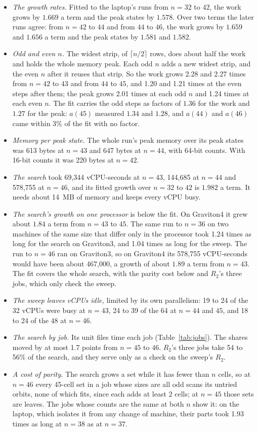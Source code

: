 \documentclass[11pt]{a000104}
\numberwithin{equation}{section}
\begin{document}
\begin{itemize}
  \item \emph{The growth rates.} Fitted to the laptop's runs from $n = 32$ to $42$, the work grows by $1.669$ a term and the peak states by $1.578$. Over two terms the later runs agree: from $n = 42$ to $44$ and from $44$ to $46$, the work grows by $1.659$ and $1.656$ a term and the peak states by $1.581$ and $1.582$.
  \item \emph{Odd and even $n$.} The widest strip, of $\lceil n/2 \rceil$ rows, does about half the work and holds the whole memory peak. Each odd $n$ adds a new widest strip, and the even $n$ after it reuses that strip. So the work grows 2.28 and 2.27 times from $n = 42$ to $43$ and from $44$ to $45$, and 1.20 and 1.21 times at the even steps after them; the peak grows 2.01 times at each odd $n$ and 1.24 times at each even $n$. The fit carries the odd steps as factors of $1.36$ for the work and $1.27$ for the peak: $a(45)$ measured $1.34$ and $1.28$, and $a(44)$ and $a(46)$ came within 3\% of the fit with no factor.
  \item \emph{Memory per peak state.} The whole run's peak memory over its peak states was 613 bytes at $n = 43$ and 647 bytes at $n = 44$, with 64-bit counts. With 16-bit counts it was 220 bytes at $n = 42$.
  \item \emph{The search} took 69{,}344 vCPU-seconds at $n = 43$, 144{,}685 at $n = 44$ and 578{,}755 at $n = 46$, and its fitted growth over $n = 32$ to $42$ is $1.982$ a term. It needs about 14~MB of memory and keeps every vCPU busy.
  \item \emph{The search's growth on one processor} is below the fit. On Graviton4 it grew about $1.84$ a term from $n = 43$ to $45$. The same run to $n = 36$ on two machines of the same size that differ only in the processor took 1.24 times as long for the search on Graviton3, and 1.04 times as long for the sweep. The run to $n = 46$ ran on Graviton3, so on Graviton4 its 578{,}755 vCPU-seconds would have been about 467{,}000, a growth of about $1.89$ a term from $n = 43$. The fit covers the whole search, with the parity cost below and $R_2$'s three jobs, which only check the sweep.
  \item \emph{The sweep leaves vCPUs idle,} limited by its own parallelism: 19 to 24 of the 32 vCPUs were busy at $n = 43$, 24 to 39 of the 64 at $n = 44$ and $45$, and 18 to 24 of the 48 at $n = 46$.
  \item \emph{The search by job.} Its unit files time each job (Table~\ref{tab:jobs}). The shares moved by at most 1.7 points from $n = 45$ to $46$. $R_2$'s three jobs take 54 to 56\% of the search, and they serve only as a check on the sweep's $R_2$.
  \item \emph{A cost of parity.} The search grows a set while it has fewer than $n$ cells, so at $n = 46$ every 45-cell set in a job whose sizes are all odd scans its untried orbits, none of which fits, since each adds at least 2 cells; at $n = 45$ those sets are leaves. The jobs whose counts are the same at both $n$ show it: on the laptop, which isolates it from any change of machine, their parts took 1.93 times as long at $n = 38$ as at $n = 37$.
\end{itemize}
\end{document}
